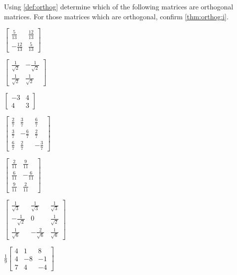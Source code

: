 \begin{exercise} \label{ex:} 
Using \autoref{def:orthog} determine which of the following matrices are orthogonal matrices.
For those matrices which are orthogonal, confirm \autoref{thm:orthog:i}.
\begin{parts}
\item \(\begin{bmatrix} \frac5{13}&\frac{12}{13}
\\-\frac{12}{13}&\frac5{13} \end{bmatrix}\)

\item \(\begin{bmatrix} \frac1{\sqrt2}&-\frac1{\sqrt2}
\\\frac1{\sqrt2}&\frac1{\sqrt2} \end{bmatrix}\)

\item \(\begin{bmatrix} -3&4
\\4&3 \end{bmatrix}\)

\item \(\begin{bmatrix} \frac27&\frac37&\frac67
\\\frac37&-\frac67&\frac27
\\\frac67&\frac27&-\frac37 \end{bmatrix}\)

\item \(\begin{bmatrix} \frac2{11}&\frac9{11}
\\\frac6{11}&-\frac6{11}
\\\frac9{11}&\frac2{11} \end{bmatrix}\)

\item \(\begin{bmatrix} \frac1{\sqrt3}&\frac1{\sqrt3}&\frac1{\sqrt3}
\\-\frac1{\sqrt2}&0&\frac1{\sqrt2}
\\\frac1{\sqrt6}&-\frac2{\sqrt6}&\frac1{\sqrt6} \end{bmatrix}\)

\item \(\frac19\begin{bmatrix} 4&1&8
\\4&-8&-1
\\7&4&-4 \end{bmatrix}\)


\end{parts}
\end{exercise}

